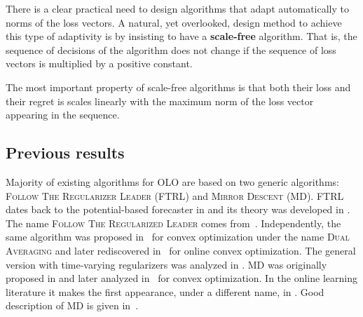 
There is a clear practical need to design algorithms that adapt automatically
to norms of the loss vectors.  A natural, yet overlooked, design method to
achieve this type of adaptivity is by insisting to have a \textbf{scale-free}
algorithm.  That is, the sequence of decisions of the algorithm does not change
if the sequence of loss vectors is multiplied by a positive constant.


The most important property of scale-free algorithms is that both their loss
and their regret is scales linearly with the maximum norm of the loss vector
appearing in the sequence.

\subsection{Previous results}

Majority of existing algorithms for OLO are based on two generic algorithms:
\textsc{Follow The Regularizer Leader} (\textsc{FTRL}) and \textsc{Mirror
Descent} (\textsc{MD}). \textsc{FTRL} dates back to the potential-based
forecaster in \cite[Chapters~11]{Cesa-Bianchi-Lugosi-2006} and its theory was
developed in \cite{Shalev-Shwartz-2007}.  The name \textsc{Follow The
Regularized Leader} comes from~\cite{Abernethy-Hazan-Rakhlin-2008}.
Independently, the same algorithm was proposed in~\cite{Nestorov-2009} for
convex optimization under the name \textsc{Dual Averaging} and later
rediscovered in~\cite{Xiao-2010} for online convex optimization. The general
version with time-varying regularizers was analyzed in
\cite{Orabona-Crammer-Cesa-Bianchi-2014}. \textsc{MD} was originally proposed
in \cite{Nemirovski-Yudin-1983} and later analyzed in~\cite{Beck-Teboulle-2003}
for convex optimization. In the online learning literature it makes the first
appearance, under a different name, in \cite{Kivinen-Warmuth-1997}. Good
description of \textsc{MD} is given in~\cite{Rakhlin-Sridharan-2009}.

